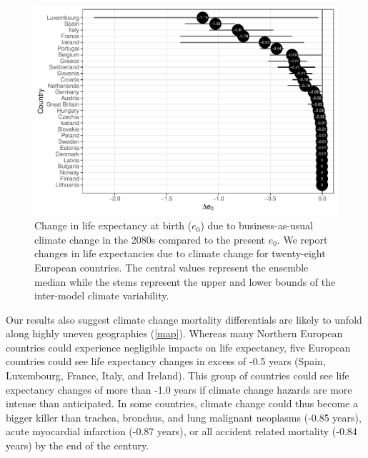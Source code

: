 \documentclass[12pt,]{article}
\makeatletter
\def\maxwidth{\ifdim\Gin@nat@width>\linewidth\linewidth
\else\Gin@nat@width\fi}
\let\Oldincludegraphics\includegraphics
\renewcommand{\includegraphics}[1]{\Oldincludegraphics[width=\maxwidth]{#1}}
\makeatother
\begin{document}
\begin{figure}
\centering
\includegraphics{MS-cclifeexpec_files/figure-latex/figure1-1.pdf}
\caption{Change in life expectancy at birth (\(e_0\)) due to
business-as-usual climate change in the 2080s compared to the present
\(e_0\). We report changes in life expectancies due to climate change
for twenty-eight European countries. The central values represent the
ensemble median while the stems represent the upper and lower bounds of
the inter-model climate variability.\label{figure1}}
\end{figure}

Our results also suggest climate change mortality differentials are
likely to unfold along highly uneven geographies (\autoref{map}).
Whereas many Northern European countries could experience negligible
impacts on life expectancy, five European countries could see life
expectancy changes in excess of -0.5 years (Spain, Luxembourg, France,
Italy, and Ireland). This group of countries could see life expectancy
changes of more than -1.0 years if climate change hazards are more
intense than anticipated. In some countries, climate change could thus
become a bigger killer than trachea, bronchus, and lung malignant
neoplasms (-0.85 years), acute myocardial infarction (-0.87 years), or
all accident related mortality (-0.84 years) \citep{arias2013united} by
the end of the century.
\end{document}
